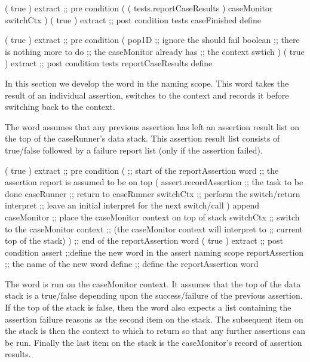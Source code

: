 \startJoylolCode
( { true } ) extract ;; pre condition
(
  ( tests.reportCaseResults )
  caseMonitor
  switchCtx
)
( { true } ) extract ;; post condition
tests
caseFinished
define
\stopJoylolCode

\startJoylolCode
( { true } ) extract ;; pre condition
(
  pop1D   ;; ignore the should fail boolean
          ;; there is nothing more to do
          ;; the caseMonitor already has
          ;; the context swtich 
)
( { true } ) extract ;; post condition
tests
reportCaseResults
define
\stopJoylolCode

\stopTestSuite


In this section we develop the  word in the 
 naming scope. This word takes the result of an individual 
assertion, switches to the  context and records it 
before switching back to the  context. 

The  word assumes that any previous assertion has 
left an assertion result list on the top of the caseRunner's data stack. 
This assertion result list consists of true/false followed by a failure 
report list (only if the assertion failed). 

\startJoylolCode
( { true } ) extract ;; pre condition
(               ;; start of the reportAssertion word
                ;; the assertion report is assumed to be on top
  (
    assert.recordAssertion  ;; the task to be done
    caseRunner  ;; return to caseRunner
    switchCtx   ;; perform the switch/return
    interpret   ;; leave an initial interpret for the next switch/call
  )
  append
  caseMonitor   ;; place the caseMonitor context on top of stack
  switchCtx     ;; switch to the caseMonitor context
                ;; (the caseMonitor context will interpret to
                ;;  current top of the stack)
)               ;; end of the reportAssertion word
( { true } ) extract ;; post condition
assert          ;;define the new word in the assert naming scope
reportAssertion ;; the name of the new word
define          ;; define the reportAssertion word
\stopJoylolCode
\stopTestSuite


The  word is run on the caseMonitor context. It 
assumes that the top of the data stack is a true/false depending upon the 
success/failure of the previous assertion. If the top of the stack is 
false, then the  word also expects a list containing 
the assertion failure reasons as the second item on the stack. The 
subsequent item on the stack is then the context to which to return so 
that any further assertions can be run. Finally the last item on the stack 
is the caseMonitor's record of assertion results. 

